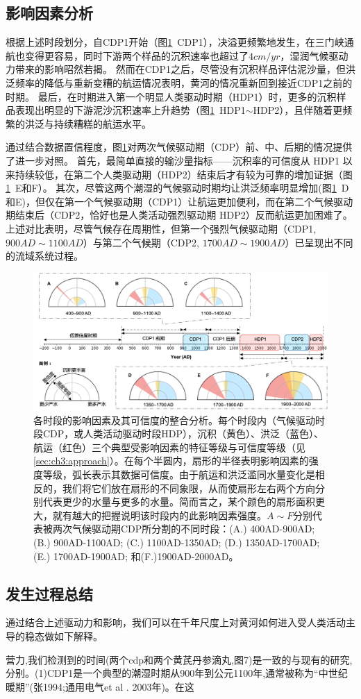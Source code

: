 \subsection{影响因素分析}

根据上述时段划分，自CDP1开始（图\ref{fig:ch3:impacts}~CDP1），决溢更频繁地发生，在三门峡通航也变得更容易，同时下游两个样品的沉积速率也超过了$4cm/yr$，湿润气候驱动力带来的影响昭然若揭。
然而在CDP1之后，尽管没有沉积样品评估泥沙量，但洪泛频率的降低与重新变糟的航运情况表明，黄河的情况重新回到接近CDP1之前的时期。
最后，在时期进入第一个明显人类驱动时期（HDP1）时，更多的沉积样品表现出明显的下游泥沙沉积速率上升趋势（图\ref{fig:ch3:impacts}~HDP1$\sim$HDP2），且伴随着更频繁的洪泛与持续糟糕的航运水平。


通过结合数据置信程度，图\ref{fig:ch3:impacts}对两次气候驱动期（CDP）前、中、后期的情况提供了进一步对照。
首先，最简单直接的输沙量指标——沉积率的可信度从 HDP1 以来持续较低，在第二个人类驱动期（HDP2）结束后才有较为可靠的增加证据（图\ref{fig:ch3:impacts}~E和F）。
其次，尽管这两个潮湿的气候驱动时期均让洪泛频率明显增加(图\ref{fig:ch3:impacts}~D和E)，但仅在第一个气候驱动期（CDP1）让航运更加便利，而在第二个气候驱动期结束后（CDP2，恰好也是人类活动强烈驱动期 HDP2）反而航运更加困难了。
上述对比表明，尽管气候存在周期性，但第一个强烈气候驱动期（CDP1, $900AD\sim1100AD$）与第二个气候期（CDP2, $1700AD\sim1900AD$）已呈现出不同的流域系统过程。

\begin{figure}[htb] %
    \includegraphics[width=\textwidth]{img/ch3/ch3_impacts.png}
    \caption[各时段的影响因素及其可信度的整合分析。]{各时段的影响因素及其可信度的整合分析。每个时段内（气候驱动时段CDP，或人类活动驱动时段HDP），沉积（黄色）、洪泛（蓝色）、航运（红色）三个典型受影响因素的特征等级与可信度等级（见\ref{sec:ch3:approach}）。在每个半圆内，扇形的半径表明影响因素的强度等级，弧长表示其数据可信度。由于航运和洪泛滥同水量变化是相反的，我们将它们放在扇形的不同象限，从而使扇形左右两个方向分别代表更少的水量与更多的水量。简而言之，某个颜色的扇形面积更大，就有越大的把握说明该时段内的此影响因素强度。$A \sim F$分别代表被两次气候驱动期CDP所分割的不同时段：(A.) 400AD-900AD; (B.) 900AD-1100AD; (C.) 1100AD-1350AD; (D.) 1350AD-1700AD; (E.) 1700AD-1900AD; 和(F.)1900AD-2000AD。}
    \label{fig:ch3:impacts}
\end{figure}

\subsection{发生过程总结}
通过结合上述驱动力和影响，我们可以在千年尺度上对黄河如何进入受人类活动主导的稳态做如下解释。

营力,我们检测到的时间(两个cdp和两个黄芪丹参滴丸,图7)是一致的与现有的研究,分别。(1)CDP1是一个典型的潮湿时期从900年到公元1100年,通常被称为“中世纪暖期”(张1994;通用电气et al . 2003年)。在这